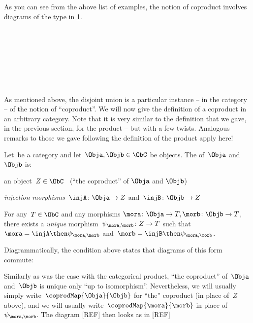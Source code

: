 As you can see from the above list of examples, the notion of coproduct involves diagrams of the type in \cref{fig:prod_generic}. 

  \begin{figure}[h!]
  \begin{center}
  \end{center}
  \caption{}
    \label{fig:prod_generic}
  \end{figure}

\

\


\

\

As mentioned above, the disjoint union is a particular instance -- in the category \Set  -- of the notion of ``coproduct''.
We will now give the definition of a coproduct in an arbitrary category. Note that it is very similar to the definition that we gave, in the previous section, for the product -- but with a few twists. Analogous remarks to those we gave following the definition of the product apply here!

\begin{ctdefinition}[Coproduct]
  \label{def:catcoproduct}
  Let~\CatC be a category and let~$\Obja, \Objb \in \ObC$ be objects. The \emph{} of~$\Obja$ and~$\Objb$ is:  \\
  \constit
  \begin{compactenum}
    \item an object~$Z \in \ObC$ \ (``the coproduct'' of $\Obja$ and $\Objb$)
    \item \emph{injection morphisms}~$\injA \colon \Obja \to Z $ and~$\injB \colon \Objb \to Z$
  \end{compactenum}
  \condit
  \begin{compactenum}
    \item For any~$T \in \ObC$ and any morphisms $\mora \colon  \Obja \to T, \morb \colon \Objb \to T$, there exists a \emph{unique} morphism~$\psi_{\mora, \morb} \colon Z \to T$ such that~$\mora = \injA\then \psi_{\mora, \morb}$ and~$\morb = \injB \then \psi_{\mora,\morb}$.
  \end{compactenum}
\end{ctdefinition}


\begin{remark}
  Diagrammatically, the condition above states that diagrams of this form commute:
  \begin{center}
  \end{center}
  \label{fig:def-coproduct-diagram}

 Similarly as was the case with the categorical product, ``the coproduct'' of~$\Obja$ and~$\Objb$ is unique only ``up to isomorphism''. Nevertheless, we will usually simply write~$\coprodMap{\Obja}{\Objb}$ for ``the'' coproduct (in place of~$Z$ above), and we will usually write~$\coprodMap{\mora}{\morb}$ in place of~$\psi_{\mora, \morb}$. The diagram [REF] then looks as in [REF]
\begin{center}
  \end{center}
  \label{fig:def-coproduct-diagram-generic}
\end{remark}

